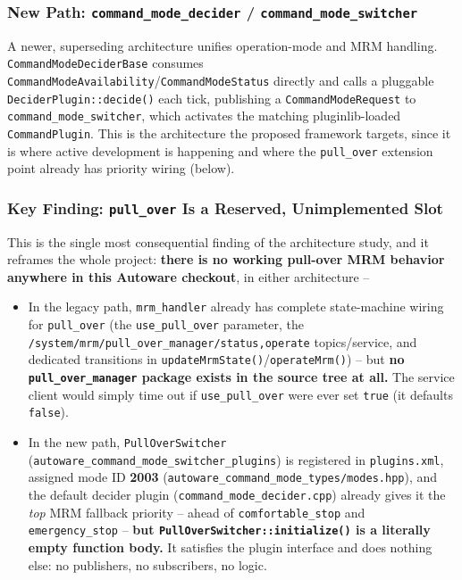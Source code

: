 \documentclass[11pt]{article}
\newcommand{\code}[1]{\texttt{#1}}
\newcommand{\pkg}[1]{\texttt{#1}}
\begin{document}
\subsubsection{New Path: \pkg{command\_mode\_decider} / \pkg{command\_mode\_switcher}}
A newer, superseding architecture unifies operation-mode and MRM handling.
\code{CommandModeDeciderBase} consumes \code{CommandModeAvailability}/\code{CommandModeStatus}
directly and calls a pluggable \code{DeciderPlugin::decide()} each tick, publishing a
\code{CommandModeRequest} to \pkg{command\_mode\_switcher}, which activates the matching
pluginlib-loaded \code{CommandPlugin}. This is the architecture the proposed framework targets,
since it is where active development is happening and where the \code{pull\_over} extension point
already has priority wiring (below).

\subsubsection{Key Finding: \code{pull\_over} Is a Reserved, Unimplemented Slot}
This is the single most consequential finding of the architecture study, and it reframes the whole
project: \textbf{there is no working pull-over MRM behavior anywhere in this Autoware checkout},
in either architecture --

\begin{itemize}[leftmargin=1.4em]
  \item In the legacy path, \pkg{mrm\_handler} already has complete state-machine wiring for
  \code{pull\_over} (the \code{use\_pull\_over} parameter, the
  \code{/system/mrm/pull\_over\_manager/status,operate} topics/service, and dedicated transitions
  in \code{updateMrmState()}/\code{operateMrm()}) -- but \textbf{no \code{pull\_over\_manager}
  package exists in the source tree at all.} The service client would simply time out if
  \code{use\_pull\_over} were ever set \code{true} (it defaults \code{false}).
  \item In the new path, \code{PullOverSwitcher} (\pkg{autoware\_command\_mode\_switcher\_plugins})
  is registered in \code{plugins.xml}, assigned mode ID \textbf{2003}
  (\pkg{autoware\_command\_mode\_types/modes.hpp}), and the default decider plugin
  (\code{command\_mode\_decider.cpp}) already gives it the \emph{top} MRM fallback priority --
  ahead of \code{comfortable\_stop} and \code{emergency\_stop} -- \textbf{but
  \code{PullOverSwitcher::initialize()} is a literally empty function body.} It satisfies the
  plugin interface and does nothing else: no publishers, no subscribers, no logic.
\end{itemize}
\end{document}
